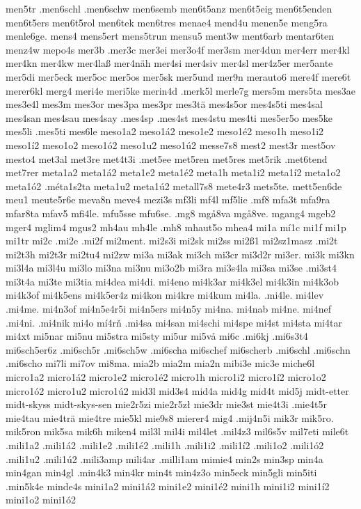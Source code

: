 {{men5tr
.men6schl
.men6schw
men6semb
men6t5anz
men6t5eig
men6t5enden
men6t5ers
men6t5rol
men6tek
men6tres
menae4
mend4u
menen5e
meng5ra
menle6ge.
mens4
mens5ert
mens5trun
mensu5
ment3w
ment6arb
mentar6ten
menz4w
mepo4s
mer3b
.mer3c
mer3ei
mer3o4f
mer3sm
mer4dun
mer4err
mer4kl
mer4kn
mer4kw
mer4laß
mer4näh
mer4si
mer4siv
mer4sl
mer4z5er
mer5ante
mer5di
mer5eck
mer5oc
mer5os
mer5sk
mer5und
mer9n
merauto6
mere4f
mere6t
merer6kl
merg4
meri4e
meri5ke
merin4d
.merk5l
merle7g
mers5m
mers5ta
mes3ae
mes3e4l
mes3m
mes3or
mes3pa
mes3pr
mes3tä
mes4s5or
mes4s5ti
mes4sal
mes4san
mes4sau
mes4say
.mes4sp
.mes4st
mes4stu
mes4ti
mes5er5o
mes5ke
mes5li
.mes5ti
mes6le
meso1a2
meso1á2
meso1e2
meso1é2
meso1h
meso1i2
meso1í2
meso1o2
meso1ó2
meso1u2
meso1ú2
messe7s8
mest2
mest3r
mest5ov
mesto4
met3al
met3re
met4t3i
.met5ee
met5ren
met5res
met5rik
.met6tend
met7rer
meta1a2
meta1á2
meta1e2
meta1é2
meta1h
meta1i2
meta1í2
meta1o2
meta1ó2
.méta1s2ta
meta1u2
meta1ú2
metall7s8
mete4r3
mets5te.
mett5en6de
meu1
meute5r6e
meva8n
meve4
mezi3s
mf3li
mf4l
mf5lie
.mf8
mfa3t
mfa9ra
mfar8ta
mfav5
mfi4le.
mfu5sse
mfu6se.
.mg8
mgå8va
mgå8ve.
mgang4
mgeb2
mger4
mglim4
mgus2
mh4au
mh4le
.mh8
mhaut5o
mhea4
mi1a
mí1c
mi1f
mi1p
mi1tr
mi2c
.mi2e
.mi2f
mi2ment.
mi2s3i
mi2sk
mi2ss
mi2ß1
mi2sz1masz
.mi2t
mi2t3h
mi2t3r
mi2tu4
mi2zw
mi3a
mi3ak
mi3ch
mi3cr
mi3d2r
mi3er.
mi3k
mi3kn
mi3l4a
mi3l4u
mi3lo
mi3na
mi3nu
mi3o2b
mi3ra
mi3s4la
mi3sa
mi3se
.mi3st4
mi3t4a
mi3te
mi3tia
mi4dea
mi4di.
mi4eno
mi4k3ar
mi4k3el
mi4k3in
mi4k3ob
mi4k3of
mi4k5ens
mi4k5er4z
mi4kon
mi4kre
mi4kum
mi4la.
.mi4le.
mi4lev
.mi4me.
mi4n3of
mi4n5e4r5i
mi4n5ers
mi4n5y
mi4na.
mi4nab
mi4ne.
mi4nef
.mi4ni.
.mi4nik
mi4o
mí4rň
.mi4sa
mi4san
mi4schi
mi4spe
mi4st
mi4sta
mi4tar
mi4xt
mi5nar
mi5nu
mi5stra
mi5sty
mi5ur
mi5vå
mi6c
.mi6kj
.mi6s3t4
mi6sch5er6z
.mi6sch5r
.mi6sch5w
.mi6scha
mi6schef
mi6scherb
.mi6schl
.mi6schn
.mi6scho
mi7li
mi7ov
mi8ma.
mia2b
mia2m
mia2n
mibi3e
mic3e
miche6l
micro1a2
micro1á2
micro1e2
micro1é2
micro1h
micro1i2
micro1í2
micro1o2
micro1ó2
micro1u2
micro1ú2
mid3l
mid3s4
mid4a
mid4g
mid4t
mid5j
midt-etter
midt-skyss
midt-skys-sen
mie2r5zi
mie2r5zł
mie3dr
mie3st
mie4t3i
.mie4t5r
mie4tau
mie4trä
mie4tre
mie5kl
mie9s8
mierer4
mig4
.mij4n5i
mik3r
mik5ro.
mik5ron
mik5sa
mik6h
miken4
mil3l
mil4i
mil4let
.mil4z3
mil6s5v
mil7eti
mile6t
.mili1a2
.mili1á2
.mili1e2
.mili1é2
.mili1h
.mili1i2
.mili1í2
.mili1o2
.mili1ó2
.mili1u2
.mili1ú2
.mili3amp
mili4ar
.milli1am
mimie4
min2s
min3sp
min4a
min4gan
min4gl
.min4k3
min4kr
min4t
min4z3o
min5eck
min5gli
min5iti
.min5k4e
minde4s
mini1a2
mini1á2
mini1e2
mini1é2
mini1h
mini1i2
mini1í2
mini1o2
mini1ó2
}}

